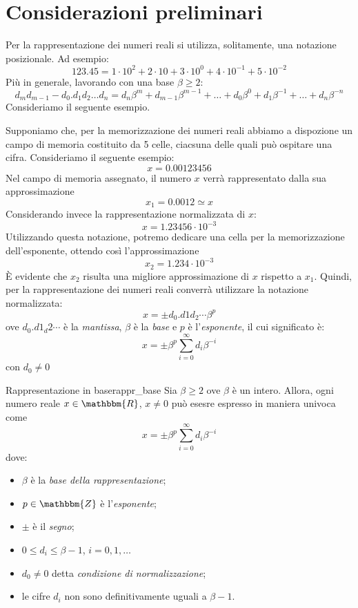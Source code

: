\documentclass[12pt]{report}
\newcounter{theorem}
\newcommand{\nmu}{}
\begin{document}
\section{Considerazioni preliminari}
Per la rappresentazione dei numeri reali si utilizza, solitamente, una notazione posizionale. Ad esempio:
\[
123.45 = 1\cdot 10^2 + 2 \cdot 10 + 3 \cdot 10^0 + 4 \cdot 10^{-1} + 5 \cdot 10^{-2}
\]
Più in generale, lavorando con una base $\beta \geq 2$:
\[
d_md_{m-1} - d_0.d_1d_2\dots d_n = d_n\beta^m + d_{m-1}\beta^{m-1} + \dots + d_0\beta^0 + d_1\beta^{-1} + \dots + d_n\beta^{-n}
\]
Consideriamo il seguente esempio.
\begin{example}{}{}
	Supponiamo che, per la memorizzazione dei numeri reali abbiamo a dispozione un campo di memoria costituito da 5 celle, ciacsuna delle quali può ospitare una cifra. Consideriamo il seguente esempio:
	\[
	x = 0.00123456
	\]
	Nel campo di memoria assegnato, il numero $x$ verrà rappresentato dalla sua approssimazione
	\[
	x_1 = 0.0012 \simeq x
	\]
	Considerando invece la rappresentazione normalizzata di $x$:
	\[
	x = 1.23456 \cdot 10^{-3}
	\]
	Utilizzando questa notazione, potremo dedicare una cella per la memorizzazione dell'esponente, ottendo così l'approssimazione
	\[
	x_2 = 1.234 \cdot 10^{-3}
	\]
	È evidente che $x_2$ risulta una migliore approssimazione di $x$ rispetto a $x_1$. Quindi, per la rappresentazione dei numeri reali converrà utilizzare la notazione normalizzata:
	\[
	x = \pm d_0.d1d_2\cdots\beta^p
	\]
	ove $d_0.d1_d2\cdots$ è la \textit{mantissa}, $\beta$ è la \textit{base} e $p$ è l'\textit{esponente}, il cui significato è:
	\[
	x = \pm \beta^p\sum_{i=0}^{\infty}d_i\beta^{-i}
	\]
	con $d_0 \neq 0$
\end{example}
\begin{theorem}{\nmu Rappresentazione in base}{rappr_base}
	Sia $\beta \geq 2$ ove $\beta$ è un intero. Allora, ogni numero reale $x \in \mathbbm{R}$, $x \neq 0$ può esesre espresso in maniera univoca come
	\[
	x = \pm\beta^p \sum_{i=0}^{\infty}d_i\beta^{-i}
	\]
	dove:
	\begin{itemize}
		\item $\beta$ è la \textit{base della rappresentazione};
		\item $p \in \mathbbm{Z}$ è l'\textit{esponente};
		\item $\pm$ è il \textit{segno};
		\item $0 \leq d_i \leq \beta - 1$, $i = 0,1, \dots$
		\item $d_0 \neq 0$ detta \textit{condizione di normalizzazione};
		\item le cifre $d_i$ non sono definitivamente uguali a $\beta - 1$.
	\end{itemize}
\end{theorem}
\end{document}
